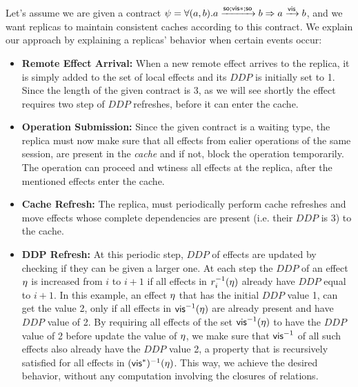 Let's assume we are given a contract $\psi=\forall (a,b). a
\xrightarrow{{\normalfont \textsf{so}};{\normalfont \textsf{vis}}*;{\normalfont \textsf{so}}}b \Rightarrow a \xrightarrow{{\normalfont \textsf{vis}}} b$, and
we want replicas to maintain consistent caches according to this
contract. We explain our approach by
explaining a replicas' behavior when certain events occur: 
\begin{itemize}
\item {\bf Remote Effect Arrival:} When a new remote effect arrives to the
replica, it is simply added to the set of local effects and 
its $DDP$ is initially set to 1. Since the length of the
given contract is 3, as we will see shortly the effect requires two step
of $DDP$ refreshes, before it can enter the cache.
\item {\bf Operation Submission: } Since the given contract is a waiting
type, the replica must now make sure that all effects from ealier
operations of the same session, are present in the \emph{cache} and if
not, 
block the operation temporarily. The operation can proceed and
wtiness all effects at the replica, after the mentioned effects enter
the cache.
\item {\bf Cache Refresh: } The replica, must periodically perform 
cache refreshes and move effects whose complete dependencies are present (i.e.
their $DDP$ is 3) to the cache. 
\item {\bf DDP Refresh: } At this periodic step, $DDP$ of effects are
updated by checking if they can be given a larger one. 
At each step the $DDP$ of an effect $\eta$ is increased from $i$ to $i+1$ if
all effects in $r_i^{-1}(\eta)$ already have $DDP$ equal to $i+1$.
In this example, an effect $\eta$ that has the initial $DDP$ value 1, can get
the value 2, only if all effects in  ${\normalfont \textsf{vis}}^{-1}(\eta)$ are already
present  and have $DDP$ value of 2. 
By requiring all effects of the set ${\normalfont \textsf{vis}}^{-1}(\eta)$ 
 to have the $DDP$ value of 2 before update the value of $\eta$, we make sure that
${\normalfont \textsf{vis}}^{-1}$ of all such effects also already have the $DDP$ value 2, a
property that is recursively satisfied for all effects in $({\normalfont \textsf{vis}}^*)^{-1}(\eta)$.
This way, we achieve the desired behavior, without any computation
involving the closures of relations.
\end{itemize}




